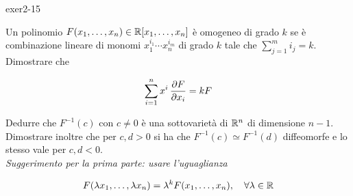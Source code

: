 {exer2-15}
{
Un polinomio $ F(x_{1},\dots,x_{n}) \in \mathbb{R}[x_{1},\dots,x_{n}] $ è omogeneo di grado $ k $ se è combinazione lineare di monomi $ x_{1}^{i_{1}} \cdots x_{n}^{i_{m}} $ di grado $ k $ tale che $ \sum_{j=1}^{m} i_{j} = k $. Dimostrare che

\begin{equation}
	\sum_{i=1}^{n} x^{i} \, \pdv{F}{x_{i}} = k F
\end{equation}

Dedurre che $ F^{-1}(c) $ con $ c \neq 0 $ è una sottovarietà di $ \mathbb{R}^{n} $ di dimensione $ n-1 $. Dimostrare inoltre che per $ c,d>0 $ si ha che $ F^{-1}(c) \simeq F^{-1}(d) $ diffeomorfe e lo stesso vale per $ c,d<0 $. \\
\textit{Suggerimento per la prima parte: usare l'uguaglianza}

\begin{equation}
	F(\lambda x_{1},\dots,\lambda x_{n}) = \lambda^{k} F(x_{1},\dots,x_{n}) %
	\qcomma \forall \lambda \in \R
\end{equation}
}

